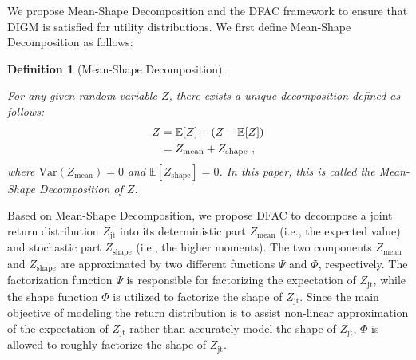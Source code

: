 \documentclass[twoside,11pt]{article}
\newcommand{\utility}{Z}
\newcommand{\joint}{\mathrm{jt}}
\newcommand{\meandecompositionfunction}{\Psi}
\newcommand{\shapedecompositionfunction}{\Phi}
\newcommand{\digm}{DIGM}
\newcounter{theorem0}
\newcounter{definition0}
\newtheorem{definition}[definition0]{Definition}
\begin{document}
We propose Mean-Shape Decomposition and the DFAC framework to ensure that \digm{} is satisfied for utility distributions. We first define Mean-Shape Decomposition as follows:
\begin{definition}[Mean-Shape Decomposition]
\label{def:mean_shape_decomposition}

For any given random variable $Z$, there exists a unique decomposition defined as follows:
\begin{equation}
\begin{split}
Z &= \mathbb{E}[Z]+(Z-\mathbb{E}[Z]) \\
&= Z_{\mathrm{mean}}+Z_{\mathrm{shape}}\ ,
\end{split}
\notag{}
\end{equation}
where $\mathrm{Var}(Z_{\mathrm{mean}})=0$ and $\mathbb{E}[Z_{\mathrm{shape}}]=0$. In this paper, this is called the Mean-Shape Decomposition of $Z$.

\end{definition} Based on Mean-Shape Decomposition, we propose DFAC to decompose a joint return distribution $\utility{}_{\joint{}}$ into its deterministic part $\utility{}_{\text{mean}}$ (i.e., the expected value) and stochastic part $\utility{}_{\text{shape}}$ (i.e., the higher moments). The two components $\utility{}_{\text{mean}}$ and $\utility{}_{\text{shape}}$ are approximated by two different functions $\meandecompositionfunction$ and $\shapedecompositionfunction$, respectively. The factorization function $\meandecompositionfunction$ is responsible for factorizing the expectation of $\utility{}_{\joint{}}$, while the shape function $\shapedecompositionfunction$ is utilized to factorize the shape of $\utility{}_{\joint{}}$. Since the main objective of modeling the return distribution is to assist non-linear approximation of the expectation of $\utility{}_{\joint{}}$ \citep{Lyle2019Comparative,BDR2022} rather than accurately model the shape of $\utility{}_{\joint{}}$, $\shapedecompositionfunction$ is allowed to roughly factorize the shape of $\utility{}_{\joint{}}$.
\end{document}
